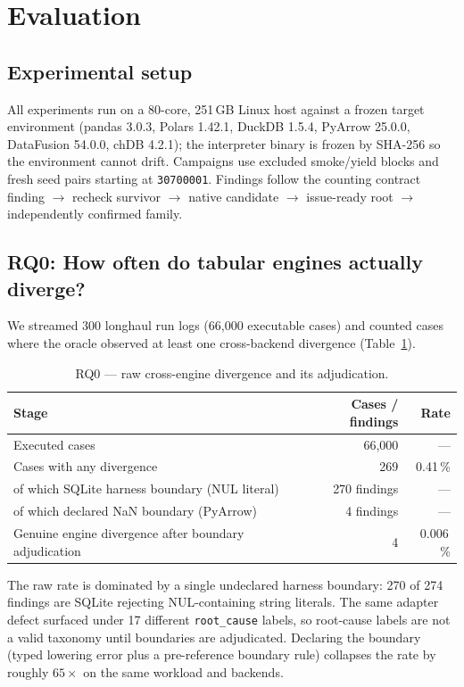 \section{Evaluation}
\label{sec:eval}

\subsection{Experimental setup}

All experiments run on a 80-core, 251\,GB Linux host against a frozen target environment
(pandas 3.0.3, Polars 1.42.1, DuckDB 1.5.4, PyArrow 25.0.0, DataFusion 54.0.0, chDB 4.2.1);
the interpreter binary is frozen by SHA-256 so the environment cannot drift. Campaigns use
excluded smoke/yield blocks and fresh seed pairs starting at \texttt{30700001}. Findings follow
the counting contract finding $\rightarrow$ recheck survivor $\rightarrow$ native candidate
$\rightarrow$ issue-ready root $\rightarrow$ independently confirmed family.

\subsection{RQ0: How often do tabular engines actually diverge?}

We streamed 300 longhaul run logs (66{,}000 executable cases) and counted cases where the
oracle observed at least one cross-backend divergence (Table~\ref{tab:rq0}).

\begin{table}[t]
\caption{RQ0 — raw cross-engine divergence and its adjudication.}
\label{tab:rq0}
\small
\begin{tabular}{@{}lrr@{}}
\toprule
Stage & Cases / findings & Rate \\
\midrule
Executed cases & 66{,}000 & --- \\
Cases with any divergence & 269 & 0.41\,\% \\
\quad of which SQLite harness boundary (NUL literal) & 270 findings & --- \\
\quad of which declared NaN boundary (PyArrow) & 4 findings & --- \\
Genuine engine divergence after boundary adjudication & 4 & 0.006\,\% \\
\bottomrule
\end{tabular}
\end{table}

The raw rate is dominated by a single undeclared harness boundary: 270 of 274 findings are
SQLite rejecting NUL-containing string literals. The same adapter defect surfaced under 17
different \texttt{root\_cause} labels, so root-cause labels are not a valid taxonomy until
boundaries are adjudicated. Declaring the boundary (typed lowering error plus a pre-reference
boundary rule) collapses the rate by roughly $65\times$ on the same workload and backends.

